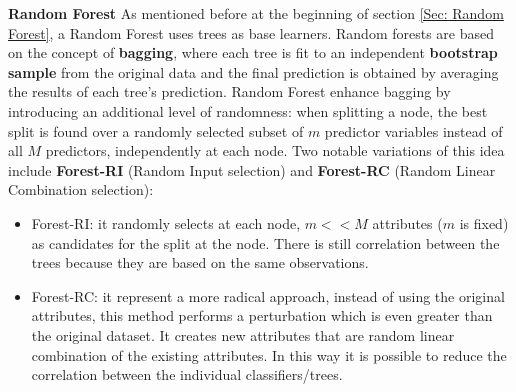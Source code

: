 \textbf{Random Forest}
As mentioned before at the beginning of section \ref{Sec: Random Forest}, a Random Forest uses trees as base learners. Random forests are based on the concept of \textbf{bagging}, where each tree is fit to an independent \textbf{bootstrap sample} from the original data and the final prediction is obtained by averaging the results of each tree's prediction. Random Forest enhance bagging by introducing an additional level of randomness: when splitting a node, the best split is found over a randomly selected subset of $m$ predictor variables instead of all $M$ predictors, independently at each node. Two notable variations of this idea include \textbf{Forest-RI} (Random Input selection) and \textbf{Forest-RC} (Random Linear Combination selection):
\begin{itemize}
    \item Forest-RI: it randomly selects at each node, $m << M$ attributes ($m$ is fixed) as candidates for the split at the node. There is still correlation between the trees because they are based on the same observations. 
    \item Forest-RC: it represent a more radical approach, instead of using the original attributes, this method performs a perturbation which is even greater than the original dataset. It creates new attributes that are random linear combination of the existing attributes. In this way it is possible to reduce the correlation between the individual classifiers/trees. 
\end{itemize}

